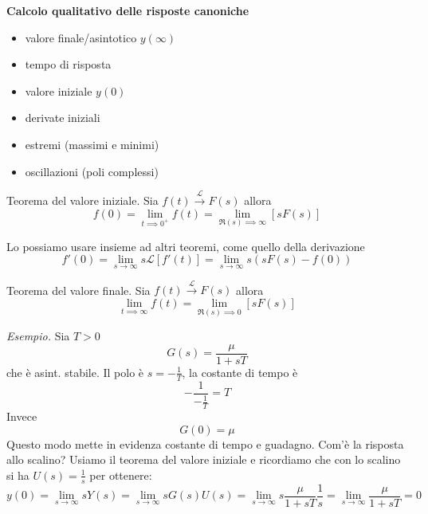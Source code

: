 \textbf{Calcolo qualitativo delle risposte canoniche}
\begin{itemize}
	\item valore finale/asintotico $y(\infty)$
	\item tempo di risposta
	\item valore iniziale $y(0)$
	\item derivate iniziali
	\item estremi (massimi e minimi)
	\item oscillazioni (poli complessi)
\end{itemize}
\begin{thm}{Teorema del valore iniziale.}{}
	Sia $f(t)\xrightarrow{\mathcal{L}} F(s)$ allora
	\begin{equation*}
		\boxed{f(0) =\lim _{t\implies 0^{+}} f(t) =\lim _{\Re(s)\implies \infty }[ sF(s)]}
	\end{equation*}
\end{thm}
Lo possiamo usare insieme ad altri teoremi, come quello della derivazione
\begin{equation*}
	f'(0) =\lim _{s\to \infty } s\mathcal{L}[ f'(t)] =\lim _{s\to \infty } s(sF(s) -f(0))
\end{equation*}
\begin{thm}{Teorema del valore finale.}{}
	Sia $f(t)\xrightarrow{\mathcal{L}} F(s)$ allora
	\begin{equation*}
		\boxed{\lim _{t\implies \infty } f(t) =\lim _{\Re(s)\implies 0}[ sF(s)]}
	\end{equation*}
\end{thm}
\textit{Esempio.} Sia $T >0$
\begin{equation*}
	G(s) =\frac{\mu }{1+sT}
\end{equation*}
che è asint. stabile. Il polo è $s=-\frac{1}{T}$, la costante di tempo è
\begin{equation*}
	-\frac{1}{-\frac{1}{T}} =T
\end{equation*}
Invece
\begin{equation*}
	G(0) =\mu 
\end{equation*}
Questo modo mette in evidenza costante di tempo e guadagno. Com'è la risposta allo scalino? Usiamo il teorema del valore iniziale e ricordiamo che con lo scalino si ha $U(s) =\frac{1}{s}$ per ottenere:
\begin{equation*}
	y(0) =\lim _{s\to \infty } sY(s) =\lim _{s\to \infty } sG(s) U(s) =\lim _{s\to \infty } s\frac{\mu }{1+sT}\frac{1}{s} =\lim _{s\to \infty }\frac{\mu }{1+sT} =0
\end{equation*}
